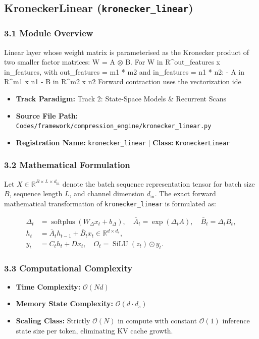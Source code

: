 \subsection{KroneckerLinear (\texttt{kronecker\_linear})}
\label{sec:app_module_kronecker\_linear}

\subsubsection*{3.1 Module Overview}
Linear layer whose weight matrix is parameterised as the Kronecker product of two smaller factor matrices: W = A $\otimes$ B.  For W in R^{out\_features x in\_features}, with out\_features = m1 * m2 and in\_features = n1 * n2: - A in R^{m1 x n1} - B in R^{m2 x n2}  Forward contraction uses the vectorization ide
\begin{itemize}
    \item \textbf{Track Paradigm:} Track 2: State-Space Models & Recurrent Scans
    \item \textbf{Source File Path:} \texttt{Codes/framework/compression\_engine/kronecker\_linear.py}
    \item \textbf{Registration Name:} \texttt{kronecker\_linear} $\mid$ \textbf{Class:} \texttt{KroneckerLinear}
\end{itemize}

\subsubsection*{3.2 Mathematical Formulation}
Let $X \in \mathbb{R}^{B \times L \times d_{\text{in}}}$ denote the batch sequence representation tensor for batch size $B$, sequence length $L$, and channel dimension $d_{\text{in}}$. The exact forward mathematical transformation of \texttt{kronecker\_linear} is formulated as:

\begin{align}
\Delta_t &= \operatorname{softplus}(W_\Delta x_t + b_\Delta), \quad \bar{A}_t = \exp(\Delta_t A), \quad \bar{B}_t = \Delta_t B_t, \\
h_t &= \bar{A}_t h_{t-1} + \bar{B}_t x_t \in \mathbb{R}^{d \times d_s}, \\
y_t &= C_t h_t + D x_t, \quad O_t = \operatorname{SiLU}(z_t) \odot y_t.
\end{align}


\subsubsection*{3.3 Computational Complexity}
\begin{itemize}
    \item \textbf{Time Complexity:} $\mathcal{O}(N d)$
    \item \textbf{Memory State Complexity:} $\mathcal{O}(d \cdot d_s)$
    \item \textbf{Scaling Class:} Strictly $\mathcal{O}(N)$ in compute with constant $\mathcal{O}(1)$ inference state size per token, eliminating KV cache growth.
\end{itemize}

